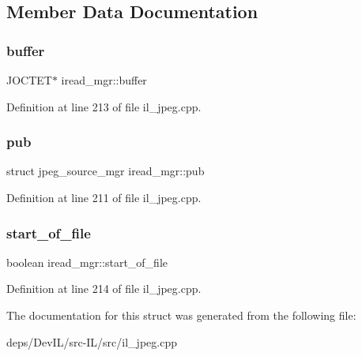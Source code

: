 \subsection{Member Data Documentation}
\mbox{\label{structiread__mgr_a1bee927b81d24d710ddc50a9b74d98f1}} 
\subsubsection{\texorpdfstring{buffer}{buffer}}
{\footnotesize\ttfamily J\+O\+C\+T\+ET$\ast$ iread\+\_\+mgr\+::buffer}



Definition at line 213 of file il\+\_\+jpeg.\+cpp.

\mbox{\label{structiread__mgr_ab40b715e1eebb3be4b8ce90a16097dd3}} 
\subsubsection{\texorpdfstring{pub}{pub}}
{\footnotesize\ttfamily struct jpeg\+\_\+source\+\_\+mgr iread\+\_\+mgr\+::pub}



Definition at line 211 of file il\+\_\+jpeg.\+cpp.

\mbox{\label{structiread__mgr_a05c2f4acdf40eeeba064f95548ffda81}} 
\subsubsection{\texorpdfstring{start\+\_\+of\+\_\+file}{start\_of\_file}}
{\footnotesize\ttfamily boolean iread\+\_\+mgr\+::start\+\_\+of\+\_\+file}



Definition at line 214 of file il\+\_\+jpeg.\+cpp.



The documentation for this struct was generated from the following file\+:\begin{DoxyCompactItemize}
\item 
deps/\+Dev\+I\+L/src-\/\+I\+L/src/il\+\_\+jpeg.\+cpp\end{DoxyCompactItemize}
